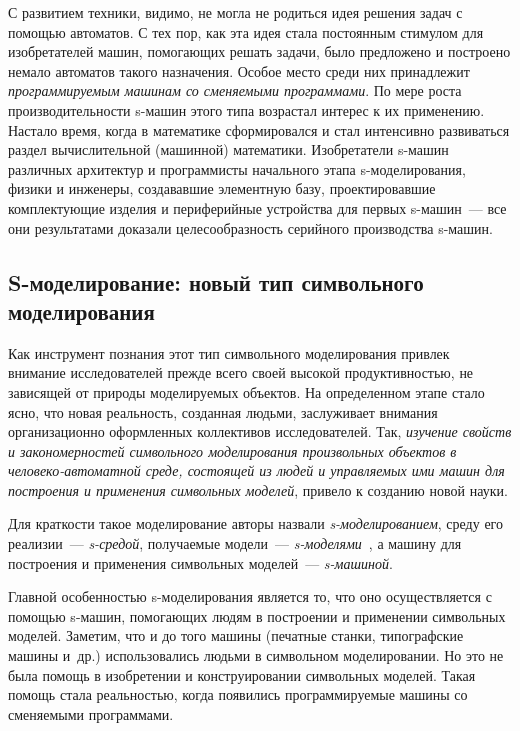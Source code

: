 \begin{multicols}{2}
С развитием техники, видимо, не могла не родиться идея решения задач с помощью 
автоматов. С тех пор, как эта идея стала постоянным стимулом для изобретателей 
машин, помогающих решать задачи, было предложено и построено немало автоматов 
такого назначения. Особое место среди них принадлежит \textit{программируемым 
машинам со сменяемыми программами}. По мере роста производительности s-машин 
этого типа возрастал интерес к их применению. Настало время, когда в математике 
сформировался и стал интенсивно развиваться раздел вычислительной (машинной) 
математики. Изобретатели s-машин различных архитектур и программисты начального 
этапа s-моделирования, физики и инженеры, создававшие элементную базу, 
проектировавшие ком\-п\-лек\-ту\-ющие изделия и периферийные устройства для 
первых s-машин~--- все они результатами доказали целесообразность серийного 
производства s-машин.

\subsection{S-моделирование: новый тип символьного моделирования }

Как инструмент познания этот тип символьного моделирования привлек
внимание исследователей прежде всего своей высокой продуктивностью, не
зависящей от природы моделируемых объектов. На определенном этапе стало
ясно, что новая реальность, созданная людьми, заслуживает внимания
организационно оформленных коллективов исследователей. Так, \textit{изучение
свойств и закономерностей символьного моделирования произвольных
объектов в человеко-автоматной среде, со\-сто\-ящей из людей и управляемых
ими машин для построения и применения символьных моделей}, привело к
созданию новой науки.

Для краткости такое моделирование авторы назвали 
\textit{s-мо\-де\-ли\-ро\-ва\-ни\-ем}, среду его реализии~--- 
\textit{s-сре\-дой}, получаемые модели~--- 
\textit{s-мо\-де\-ля\-ми}~\cite{1il}, а машину для построения и применения 
символьных моделей~--- \textit{s-ма\-ши\-ной}.

Главной особенностью s-моделирования является то, что оно осуществляется с 
помощью s-ма\-шин, помогающих людям в построении и применении символьных 
моделей. Заметим, что и до того машины (печатные станки, типографские машины 
и~др.) использовались людьми в символьном моделировании. Но это не была помощь 
в изобре\-те\-нии и конструировании символьных моделей. Такая помощь стала 
реальностью, когда появились программируемые машины со сменяемыми программами.
{

}
\end{multicols}
